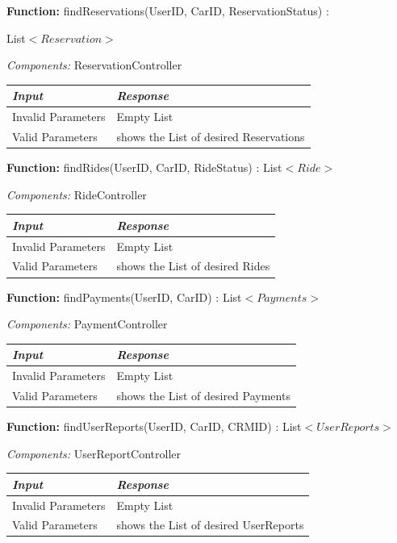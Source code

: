 \documentclass[a4paper]{article}
\begin{document}
\textbf{Function:} findReservations(UserID, CarID, ReservationStatus) : \par List\(<Reservation>\) \par
\textit{Components:} ReservationController
\begin{center}
\begin{tabular}{ | L{6cm} | L{6cm} | }
\hline
	\textit{Input}& \textit{Response}\\ \hline
	Invalid Parameters & Empty List\\ \hline
	Valid Parameters & shows the List of desired Reservations\\ \hline
\end{tabular}
\end{center}
\textbf{Function:} findRides(UserID, CarID, RideStatus) : List\(<Ride>\) \par
\textit{Components:} RideController
\begin{center}
\begin{tabular}{ | L{6cm} | L{6cm} | }
\hline
	\textit{Input}& \textit{Response}\\ \hline
	Invalid Parameters & Empty List\\ \hline
	Valid Parameters & shows the List of desired Rides\\ \hline
\end{tabular}
\end{center}
\textbf{Function:} findPayments(UserID, CarID) : List\(<Payments>\) \par
\textit{Components:} PaymentController
\begin{center}
\begin{tabular}{ | L{6cm} | L{6cm} | }
\hline
	\textit{Input}& \textit{Response}\\ \hline
	Invalid Parameters & Empty List\\ \hline
	Valid Parameters & shows the List of desired Payments\\ \hline
\end{tabular}
\end{center}

\textbf{Function:} findUserReports(UserID, CarID, CRMID) : List\(<UserReports>\) \par
\textit{Components:} UserReportController
\begin{center}
\begin{tabular}{ | L{6cm} | L{6cm} | }
\hline
	\textit{Input}& \textit{Response}\\ \hline
	Invalid Parameters & Empty List\\ \hline
	Valid Parameters & shows the List of desired UserReports\\ \hline
\end{tabular}
\end{center}
\end{document}
